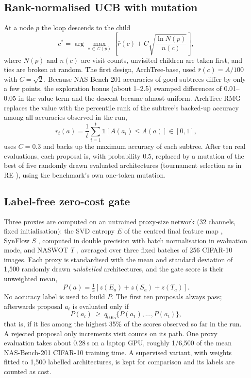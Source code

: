 \documentclass{sadhana}
\newcommand{\algname}{ArchTree}
\newcommand{\rmg}{ArchTree-RMG}
\begin{document}
\subsection{Rank-normalised UCB with mutation}

At a node $p$ the loop descends to the child
\begin{equation}
c^{*}=\arg\max_{c\,\in\,\mathcal{C}(p)}\left[\bar r(c)+C\sqrt{\frac{\ln N(p)}{n(c)}}\right],\label{eq:ucb}
\end{equation}
where $N(p)$ and $n(c)$ are visit counts, unvisited children are taken first, and ties are broken at random. The first design, \algname-base, used $\bar r(c)=A/100$ with $C=\sqrt{2}$. Because NAS-Bench-201 accuracies of good subtrees differ by only a few points, the exploration bonus (about 1--2.5) swamped differences of 0.01--0.05 in the value term and the descent became almost uniform. \rmg{} replaces the value with the percentile rank of the subtree's backed-up accuracy among all accuracies observed in the run,
\begin{equation}
r_t(a)=\frac{1}{t}\sum_{i=1}^{t}\mathbb{1}\left[A(a_i)\le A(a)\right]\in[0,1],\label{eq:rank}
\end{equation}
uses $C=0.3$ and backs up the maximum accuracy of each subtree. After ten real evaluations, each proposal is, with probability 0.5, replaced by a mutation of the best of five randomly drawn evaluated architectures (tournament selection as in RE \cite{real2019}), using the benchmark's own one-token mutation.

\subsection{Label-free zero-cost gate}\label{sec:gate}

Three proxies are computed on an untrained proxy-size network (32 channels, fixed initialisation): the SVD entropy $E$ of the centred final feature map \cite{roy2007}, SynFlow $S$ \cite{tanaka2020}, computed in double precision with batch normalisation in evaluation mode, and NASWOT $T$ \cite{mellor2021}, averaged over three fixed batches of 256 CIFAR-10 images. Each proxy is standardised with the mean and standard deviation of 1,500 randomly drawn \emph{unlabelled} architectures, and the gate score is their unweighted mean,
\begin{equation}
P(a)=\tfrac{1}{3}\left[z(E_a)+z(S_a)+z(T_a)\right].\label{eq:proxy}
\end{equation}
No accuracy label is used to build $P$. The first ten proposals always pass; afterwards proposal $a_t$ is evaluated only if
\begin{equation}
P(a_t)\ \ge\ q_{0.65}\{P(a_1),\dots,P(a_t)\},\label{eq:gate}
\end{equation}
that is, if it lies among the highest 35\% of the scores observed so far in the run. A rejected proposal only increments visit counts on its path. One proxy evaluation takes about 0.28\,s on a laptop GPU, roughly 1/6,500 of the mean NAS-Bench-201 CIFAR-10 training time. A supervised variant, with weights fitted to 1,500 labelled architectures, is kept for comparison and its labels are counted as cost.
\end{document}
